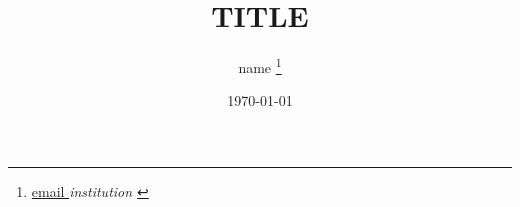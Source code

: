\documentclass[a4paper,draft]{article}
\begin{document}
\title{TITLE}
\author{ {{ name }}%
    \thanks{\href{mailto: {{ email }} }{ {{ email }} } \newline \textit{ {{ institution }} }%
        }
    }
\date{\today}

\maketitle

\begin{abstract}
\end{abstract}





\end{document}
